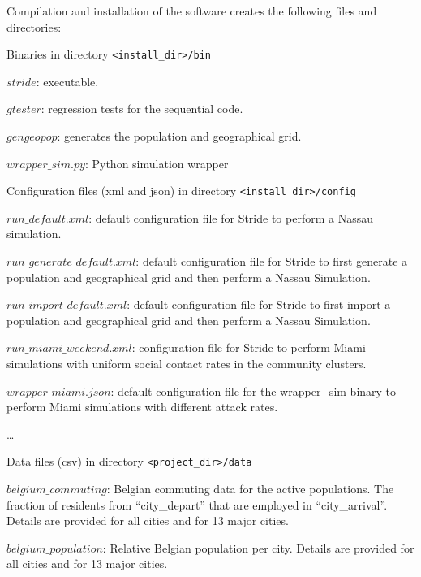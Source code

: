 Compilation and installation of the software creates the following files and directories:
\begin{compactitem}
%
	\item Binaries in directory \texttt{<install\_dir>/bin}
      		\begin{compactitem}
        			\item $stride$: executable.
        			\item $gtester$: regression tests for the sequential code.
               	 \item $gengeopop$: generates the population and geographical grid.
        			\item $wrapper\_sim.py$: Python simulation wrapper
        	\end{compactitem}
%
    \item Configuration files (xml and json) in directory \texttt{<install\_dir>/config}
      	\begin{compactitem}
			\item $run\_default.xml$: default configuration file for Stride to perform a Nassau simulation.
        		\item $run\_generate\_default.xml$: default configuration file for Stride to first generate a population and geographical grid and then perform a Nassau Simulation.
       		\item $run\_import\_default.xml$: default configuration file for Stride to first import a population and geographical grid and then perform a Nassau Simulation.
        		\item $run\_miami\_weekend.xml$: configuration file for Stride to perform Miami simulations with uniform social contact rates in the community clusters.
			\item $wrapper\_miami.json$: default configuration file for the wrapper\_sim binary to perform Miami simulations with different attack rates.
        		\item \ldots
        \end{compactitem}
%        
    \item Data files (csv) in directory \texttt{<project\_dir>/data}
      	\begin{compactitem}
        		\item $belgium\_commuting$: Belgian commuting data for the active populations. The fraction of residents from ``city\_depart'' that are employed in ``city\_arrival''. Details are provided for all cities and for 13 major cities.
			\item $belgium\_population$: Relative Belgian population per city. Details are provided for all cities and for 13 major cities.

\end{compactitem}
\end{compactitem}
